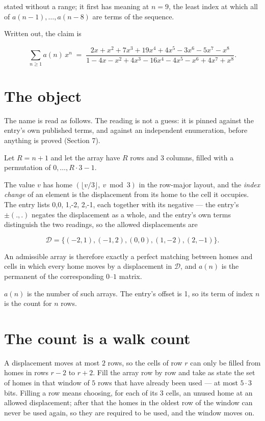 \documentclass[11pt]{article}
\theoremstyle{definition}
\begin{document}
stated without a range; it first has meaning at $n = 9$, the least index at which all of $a(n-1),\dots,a(n-8)$ are terms of the sequence.

Written out, the claim is

\[\sum_{n \ge 1} a(n)\,x^n \;=\; \frac{2x + x^{2} + 7x^{3} + 19x^{4} + 4x^{5} - 3x^{6} - 5x^{7} - x^{8}}{1 - 4x - x^{2} + 4x^{3} - 16x^{4} - 4x^{5} - x^{6} + 4x^{7} + x^{8}}.\]

\section{The object}

The name is read as follows. The reading is not a guess: it is pinned against the entry's own published terms, and against an independent enumeration, before anything is proved (Section 7).

Let $R = n + 1$ and let the array have $R$ rows and $3$ columns, filled with a permutation of $0,\dots,R\cdot3-1$.

The value $v$ has home $(\lfloor v/3\rfloor,\ v \bmod 3)$ in the row-major layout, and the {\itshape index change} of an element is the displacement from its home to the cell it occupies. The entry lists 0,0, 1,-2, 2,-1, each together with its negative --- the entry's $\pm(.,.)$ negates the displacement as a whole, and the entry's own terms distinguish the two readings, so the allowed displacements are

\[\mathcal{D} = \{(-2,1), (-1,2), (0,0), (1,-2), (2,-1)\}.\]

An admissible array is therefore exactly a perfect matching between homes and cells in which every home moves by a displacement in $\mathcal{D}$, and $a(n)$ is the permanent of the corresponding $0$--$1$ matrix.

$a(n)$ is the number of such arrays. The entry's offset is 1, so its term of index $n$ is the count for $n$ rows.

\section{The count is a walk count}

A displacement moves at most $2$ rows, so the cells of row $r$ can only be filled from homes in rows $r-2$ to $r+2$. Fill the array row by row and take as state the set of homes in that window of $5$ rows that have already been used --- at most $5\cdot3$ bits. Filling a row means choosing, for each of its $3$ cells, an unused home at an allowed displacement; after that the homes in the oldest row of the window can never be used again, so they are required to be used, and the window moves on.
\end{document}
